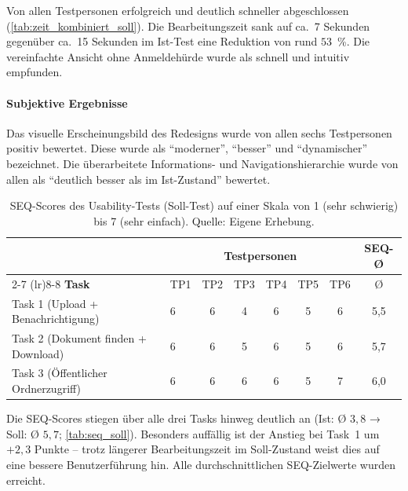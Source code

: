 Von allen Testpersonen erfolgreich und deutlich schneller abgeschlossen (\autoref{tab:zeit_kombiniert_soll}). Die Bearbeitungszeit sank auf ca.~7 Sekunden gegenüber ca.~15 Sekunden im Ist-Test \textendash{} eine Reduktion von rund $53$~\%. Die vereinfachte Ansicht ohne Anmeldehürde wurde als schnell und intuitiv empfunden.

\paragraph{Subjektive Ergebnisse}

Das visuelle Erscheinungsbild des Redesigns wurde von allen sechs Testpersonen positiv bewertet. Diese wurde als \enquote{moderner}, \enquote{besser} und \enquote{dynamischer} bezeichnet. Die überarbeitete Informations- und Navigationshierarchie wurde von allen als \enquote{deutlich besser als im Ist-Zustand} bewertet.

\begin{table}[H]
  \centering
  \scriptsize
  \begin{tabular}{p{2.8cm} p{0.45cm} c c c c c | c}
    \toprule
    \multicolumn{1}{c}{} & \multicolumn{6}{c|}{\textbf{Testpersonen}} & \multicolumn{1}{c}{\textbf{SEQ-Ø}} \\
    \cmidrule(lr){2-7} \cmidrule(lr){8-8}
    \textbf{Task} & TP1 & TP2 & TP3 & TP4 & TP5 & TP6 & Ø \\
    \midrule
    Task 1 (Upload + Benachrichtigung) & 6 & 6 & 4 & 6 & 5 & 6 & 5{,}5 \\
    Task 2 (Dokument finden + Download) & 6 & 6 & 5 & 6 & 5 & 6 & 5{,}7 \\
    Task 3 (Öffentlicher Ordnerzugriff) & 6 & 6 & 6 & 6 & 5 & 7 & 6{,}0 \\
    \bottomrule
  \end{tabular}
  \caption[SEQ-Scores Soll-Test]{SEQ-Scores des Usability-Tests (Soll-Test) auf einer Skala von 1 (sehr schwierig) bis 7 (sehr einfach). Quelle: Eigene Erhebung.}
  \label{tab:seq_soll}
\end{table}

Die SEQ-Scores stiegen über alle drei Tasks hinweg deutlich an (Ist: Ø $3,8$ → Soll: Ø $5,7$; \autoref{tab:seq_soll}). Besonders auffällig ist der Anstieg bei Task~1 um $+2,3$ Punkte -- trotz längerer Bearbeitungszeit im Soll-Zustand weist dies auf eine bessere Benutzerführung hin. Alle durchschnittlichen SEQ-Zielwerte wurden erreicht.


